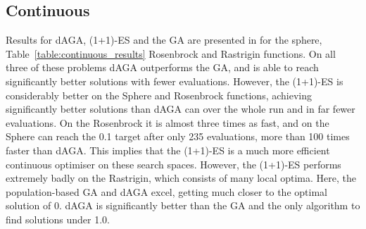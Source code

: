 \documentclass[runningheads,a4paper]{llncs}
\begin{document}
\subsection{Continuous}
Results for dAGA, (1+1)-ES and the GA are presented in for the sphere, Table~\ref{table:continuous_results} Rosenbrock and Rastrigin functions. On all three of these problems dAGA outperforms the GA, and is able to reach significantly better solutions with fewer evaluations. However, the (1+1)-ES is considerably better on the Sphere and Rosenbrock functions, achieving significantly better solutions than dAGA can over the whole run and in far fewer evaluations. On the Rosenbrock it is almost three times as fast, and on the Sphere can reach the 0.1 target after only 235 evaluations, more than 100 times faster than dAGA. This implies that the (1+1)-ES is a much more efficient continuous optimiser on these search spaces. However, the (1+1)-ES performs extremely badly on the Rastrigin, which consists of many local optima. Here, the population-based GA and dAGA excel, getting much closer to the optimal solution of 0. dAGA is significantly better than the GA and the only algorithm to find solutions under 1.0.
\end{document}
